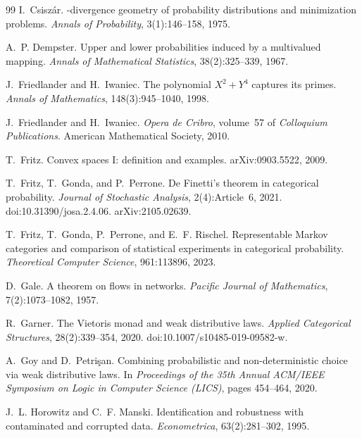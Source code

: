 \documentclass[11pt]{article}
\theoremstyle{definition}
\theoremstyle{remark}
\begin{document}
\begin{thebibliography}{99}
I.~Csisz\'ar.
-divergence geometry of probability distributions and minimization problems.
\newblock \emph{Annals of Probability}, 3(1):146--158, 1975.

A.~P. Dempster.
\newblock Upper and lower probabilities induced by a multivalued mapping.
\newblock \emph{Annals of Mathematical Statistics}, 38(2):325--339, 1967.

J.~Friedlander and H.~Iwaniec.
\newblock The polynomial {$X^2+Y^4$} captures its primes.
\newblock \emph{Annals of Mathematics}, 148(3):945--1040, 1998.

J.~Friedlander and H.~Iwaniec.
\newblock \emph{Opera de Cribro}, volume~57 of \emph{Colloquium Publications}.
\newblock American Mathematical Society, 2010.

T.~Fritz.
\newblock Convex spaces {I}: definition and examples.
\newblock arXiv:0903.5522, 2009.

T.~Fritz, T.~Gonda, and P.~Perrone.
\newblock De {F}inetti's theorem in categorical probability.
\newblock \emph{Journal of Stochastic Analysis}, 2(4):Article~6, 2021.
\newblock doi:10.31390/josa.2.4.06. arXiv:2105.02639.

T.~Fritz, T.~Gonda, P.~Perrone, and E.~F. Rischel.
\newblock Representable {M}arkov categories and comparison of statistical experiments in categorical
  probability.
\newblock \emph{Theoretical Computer Science}, 961:113896, 2023.

D.~Gale.
\newblock A theorem on flows in networks.
\newblock \emph{Pacific Journal of Mathematics}, 7(2):1073--1082, 1957.

R.~Garner.
\newblock The {V}ietoris monad and weak distributive laws.
\newblock \emph{Applied Categorical Structures}, 28(2):339--354, 2020.
\newblock doi:10.1007/s10485-019-09582-w.

A.~Goy and D.~Petri\c{s}an.
\newblock Combining probabilistic and non-deterministic choice via weak distributive laws.
\newblock In \emph{Proceedings of the 35th Annual ACM/IEEE Symposium on Logic in Computer Science
  (LICS)}, pages 454--464, 2020.

J.~L. Horowitz and C.~F. Manski.
\newblock Identification and robustness with contaminated and corrupted data.
\newblock \emph{Econometrica}, 63(2):281--302, 1995.


\end{thebibliography}
\end{document}
